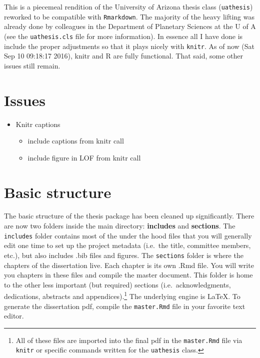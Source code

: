 \documentclass[11pt,report]{uncdissertation}
\providecommand{\tightlist}{%
  \setlength{\itemsep}{0pt}\setlength{\parskip}{0pt}}
\let\rmarkdownfootnote\footnote%
\def\footnote{\protect\rmarkdownfootnote}
\begin{document}
This is a piecemeal rendition of the University of Arizona thesis class
(\texttt{uathesis}) reworked to be compatible with \texttt{Rmarkdown}.
The majority of the heavy lifting was already done by colleagues in the
Department of Planetary Sciences at the U of A (see the
\texttt{uathesis.cls} file for more information). In essence all I have
done is include the proper adjustments so that it plays nicely with
\texttt{knitr}. As of now (Sat Sep 10 09:18:17 2016), knitr and R are
fully functional. That said, some other issues still remain.

\section{\texorpdfstring{Issues\label{issues}}{Issues}}\label{issues}

\begin{itemize}
\tightlist
\item
  Knitr captions

  \begin{itemize}
  \tightlist
  \item
    include captions from knitr call
  \item
    include figure in LOF from knitr call
  \end{itemize}
\end{itemize}

\section{Basic structure}\label{basic-structure}

The basic structure of the thesis package has been cleaned up
significantly. There are now two folders inside the main directory:
\textbf{includes} and \textbf{sections}. The \texttt{includes} folder
contains most of the under the hood files that you will generally edit
one time to set up the project metadata (i.e.~the title, committee
members, etc.), but also includes .bib files and figures. The
\texttt{sections} folder is where the chapters of the dissertation live.
Each chapter is its own .Rmd file. You will write you chapters in these
files and compile the master document. This folder is home to the other
less important (but required) sections (i.e.~acknowledgments,
dedications, abstracts and appendices).\footnote{All of these files are
  imported into the final pdf in the \texttt{master.Rmd} file via
  \texttt{knitr} or specific commands written for the \texttt{uathesis}
  class.} The underlying engine is \LaTeX. To generate the dissertation
pdf, compile the \texttt{master.Rmd} file in your favorite text editor.
\end{document}
